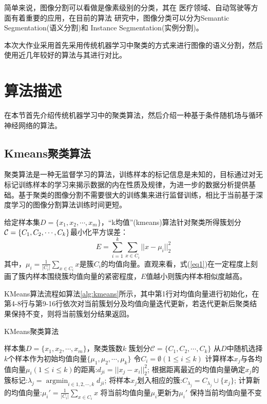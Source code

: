 \documentclass[a4paper]{article}
\DeclareMathOperator*{\argmin}{argmin}
\begin{document}
简单来说，图像分割可以看做是像素级别的分类，其在 医疗领域、自动驾驶等方面有着重要的应用，在目前的算法 研究中，图像分类可以分为Semantic Segmentation(语义分割)和 Instance Segmentation(实例分割)。

本次大作业采用首先采用传统机器学习中聚类的方式来进行图像的语义分割，然后使用近几年较好的算法与其进行对比。

\section{算法描述}
在本节首先介绍传统机器学习中的聚类算法，然后介绍一种基于条件随机场与循环神经网络的算法。

\subsection{Kmeans聚类算法}
聚类算法是一种无监督学习的算法，训练样本的标记信息是未知的，目标通过对无标记训练样本的学习来揭示数据的内在性质及规律，为进一步的数据分析提供基础。基于聚类的图像分割不需要很大的训练集来进行监督训练，相比于当前基于深度学习的图像分割算法训练时间更短。

给定样本集$D=\{x_1,x_2,\cdots,x_m \}$，“k均值”(kmeans)算法针对聚类所得簇划分$\mathcal{C}=\{C_1,C_2,\cdots\\,C_k \}$最小化平方误差：
\begin{equation}
\label{eq1}
E=\sum_{i=1}^{k}\sum_{x\in C_i}||x-\mu_i||_2^2
\end{equation}
其中，$\mu_i=\frac{1}{|C_i|}\sum_{x\in C_i}x$是簇$C_i$的均值向量。直观来看，式(\ref{eq1})在一定程度上刻画了簇内样本围绕簇均值向量的紧密程度，$E$值越小则簇内样本相似度越高。

KMeans算法流程如算法\ref{alg:kmeans}所示，其中第1行对均值向量进行初始化，在第4-8行与第9-16行依次对当前簇划分及均值向量迭代更新，若迭代更新后聚类结果保持不变，则将当前簇划分结果返回。

\begin{algorithm}[htbp]
	\caption{KMeans聚类算法}
	\label{alg:kmeans}
	\begin{algorithmic}[1]
		\Require 样本集$D=\{x_1,x_2,\cdots,x_m \}$，聚类簇数$k$
		\Ensure 簇划分$\mathcal{C}=\{C_1,C_2,\cdots,C_k \}$
		\State 从$D$中随机选择$k$个样本作为初始均值向量$\{\mu_1,\mu_2,\cdots,\mu_k \}$
		\Repeat 
		\State 令$C_i=\emptyset(1\le i\le k)$
		\State 计算样本$x_j$与各均值向量$\mu_i(1\le i\le k)$的距离:$d_{ji}=||x_j-x_i||_2^2$;
		\State 根据距离最近的均值向量确定$x_j$的簇标记:$\lambda_j=\argmin_{i\in {1,2,\cdots,k}}d_{ji}$;
		\State 将样本$x_j$划入相应的簇:$C_{\lambda_j}=C_{\lambda_j}\cup\{x_j\}$;
		\EndFor
		\State 计算新的均值向量:$\mu_i'=\frac{1}{|C_i|}\sum_{x\in C_i}x$
		\State 将当前均值向量$\mu_i$更新为$\mu_i'$
		\Else
		\State 保持当前均值向量不变
		\EndIf
		\EndFor
	\end{algorithmic}
\end{algorithm}
\end{document}
